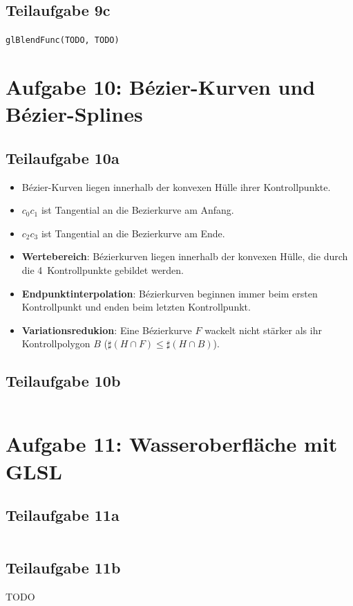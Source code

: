 \documentclass[a4paper]{scrartcl}
\begin{document}
\subsection*{Teilaufgabe 9c}
\texttt{glBlendFunc(TODO, TODO)}


\section*{Aufgabe 10: Bézier-Kurven und Bézier-Splines}
\subsection*{Teilaufgabe 10a}

\begin{itemize}
    \item Bézier-Kurven liegen innerhalb der konvexen Hülle ihrer Kontrollpunkte.
    \item $c_0 c_1$ ist Tangential an die Bezierkurve am Anfang.
    \item $c_2 c_3$ ist Tangential an die Bezierkurve am Ende.
    \item \textbf{Wertebereich}: Bézierkurven liegen innerhalb der konvexen
          Hülle, die durch die 4~Kontrollpunkte gebildet werden.
    \item \textbf{Endpunktinterpolation}: Bézierkurven beginnen immer beim
          ersten Kontrollpunkt und enden beim letzten Kontrollpunkt.
    \item \textbf{Variationsredukion}: Eine Bézierkurve $F$ wackelt nicht stärker
          als ihr Kontrollpolygon $B$ ($\sharp (H \cap F) \leq \sharp (H \cap B)$).
\end{itemize}

\clearpage
\subsection*{Teilaufgabe 10b}
\inputminted[linenos, numbersep=5pt, tabsize=4, frame=lines, label=shader.vert]{glsl}{shader.vert}

\clearpage
\section*{Aufgabe 11: Wasseroberfläche mit GLSL}
\subsection*{Teilaufgabe 11a}
\inputminted[linenos, numbersep=5pt, tabsize=4, frame=lines, label=shader.frag]{glsl}{shader.frag}

\subsection*{Teilaufgabe 11b}
TODO
\end{document}
